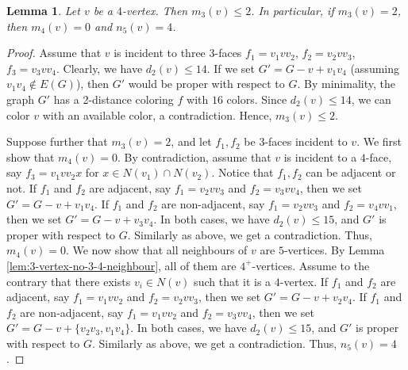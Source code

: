 \documentclass[12pt, reqno]{amsart}
\theoremstyle{plain}
\newtheorem{lemma}[equation]{Lemma}
\theoremstyle{definition}
\numberwithin{equation}{section}
\begin{document}
\begin{lemma}\label{lem:4-vertex-has-no-two-3-face}
Let $v$ be a $4$-vertex. Then $m_3(v)\leq 2$. In particular, if  $m_3(v)=2$, then  $m_4(v)=0$ and $n_5(v)=4$.
\end{lemma}
\begin{proof}
Assume that $v$ is incident to three $3$-faces $f_1=v_1vv_2$, $f_2=v_2vv_3$, $f_3=v_3vv_4$. Clearly, we have $d_2(v)\leq 14$. If we set $G'=G-v+v_1v_4$ (assuming $v_1v_4\notin E(G)$), then $G'$ would be proper with respect to $G$.  By minimality, the graph $G'$ has a 2-distance coloring $f$ with $16$ colors. Since $d_2(v)\leq 14$, we can color $v$ with an available color, a contradiction. Hence, $m_3(v)\leq 2$.

Suppose further that $m_3(v)=2$, and let $f_1,f_2$ be $3$-faces incident to $v$. We first show that $m_4(v)=0$. By contradiction, assume that $v$ is incident to a $4$-face, say $f_3=v_1vv_2x$ for $x\in N(v_1)\cap N(v_2)$. Notice that $f_1,f_2$ can be adjacent or not. If $f_1$ and $f_2$ are adjacent, say $f_1=v_2vv_3$ and $f_2=v_3vv_4$, then we set $G'=G-v+v_1v_4$. If $f_1$ and $f_2$ are non-adjacent, say $f_1=v_2vv_3$ and $f_2=v_4vv_1$, then we set $G'=G-v+v_3v_4$. In both cases, we have $d_2(v)\leq 15$, and $G'$ is proper with respect to $G$. Similarly as above, we get a contradiction. Thus, $m_4(v)=0$.
We now show that all neighbours of $v$ are $5$-vertices. By Lemma \ref{lem:3-vertex-no-3-4-neighbour}, all of them are $4^+$-vertices.  Assume to the contrary that  there exists  $v_i\in N(v)$ such that it is a $4$-vertex. If $f_1$ and $f_2$ are adjacent, say $f_1=v_1vv_2$ and $f_2=v_2vv_3$, then we set $G'=G-v+v_2v_4$. If $f_1$ and $f_2$ are non-adjacent, say $f_1=v_1vv_2$ and $f_2=v_3vv_4$, then we set $G'=G-v+\{v_2v_3,v_1v_4\}$. In both cases, we have $d_2(v)\leq 15$, and $G'$ is proper with respect to $G$. Similarly as above, we get a contradiction. Thus, $n_5(v)=4$. 
\end{proof}
\end{document}

